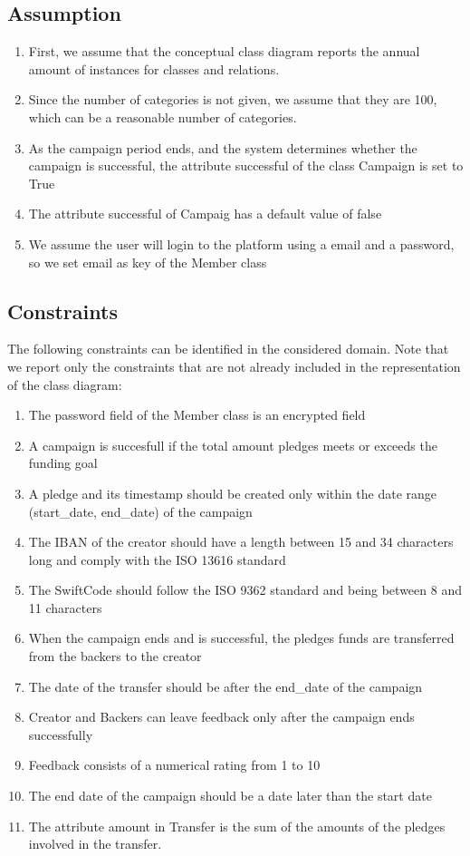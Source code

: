 \documentclass[pdflatex,sn-mathphys-num]{sn-jnl}
\begin{document}
\subsection{Assumption}
\begin{enumerate}
\item First, we assume that the conceptual class diagram reports the annual amount of instances for classes and relations.
\item Since the number of categories is not given, we assume that they are 100, which can be a reasonable number of categories.
\item As the campaign period ends, and the system determines whether the campaign is successful, the attribute successful of the class Campaign is set to True
\item The attribute successful of Campaig has a default value of false
\item We assume the user will login to the platform using a email and a password, so we set email as key of the Member class

\end{enumerate}
\subsection{Constraints}
The following constraints can be identified in the considered domain. Note that we report only the
constraints that are not already included in the representation of the class diagram:
\begin{enumerate}
\item The password field of the Member class is an encrypted field
\item A campaign is succesfull if the total amount pledges meets or exceeds the funding goal
\item A pledge and its timestamp should be created only within the date range (start\_date, end\_date) of the campaign
\item The IBAN of the creator should have a  length between 15 and 34 characters long and comply with the ISO 13616 standard
\item The SwiftCode should follow the ISO 9362 standard and being between 8 and 11 characters
\item When the campaign ends and is successful, the pledges funds are transferred from the backers to the creator
\item The date of the transfer should be after the end\_date of the campaign
\item Creator and Backers can leave feedback only after the campaign ends successfully
\item Feedback consists of a numerical rating from 1 to 10
\item The end date of the campaign should be a date later than the start date
\item The attribute amount in Transfer is the sum of the amounts of the pledges involved in the transfer.
\end{enumerate}
\end{document}
